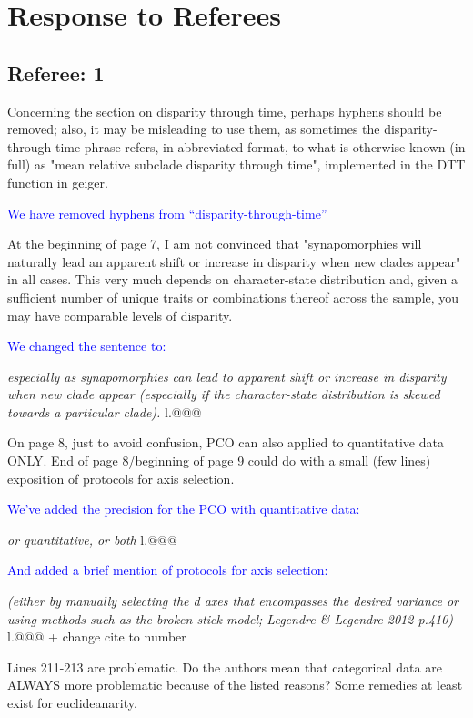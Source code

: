 \documentclass[12pt,letterpaper]{article}
\begin{document}
\section{Response to Referees}

\subsection{Referee: 1}
\noindent Concerning the section on disparity through time, perhaps hyphens should be removed; also, it may be misleading to use them, as sometimes the disparity-through-time phrase refers, in abbreviated format, to what is otherwise known (in full) as "mean relative subclade disparity through time", implemented in the DTT function in geiger.

\textcolor{blue}{We have removed hyphens from ``disparity-through-time''}

\noindent At the beginning of page 7, I am not convinced that "synapomorphies will naturally lead an apparent shift or increase in disparity when new clades appear" in all cases. This very much depends on character-state distribution and, given a sufficient number of unique traits or combinations thereof across the sample, you may have comparable levels of disparity.

\textcolor{blue}{We changed the sentence to:}

\textit{especially as synapomorphies can lead to apparent shift or increase in disparity when new clade appear (especially if the character-state distribution is skewed towards a particular clade).} l.@@@

\noindent On page 8, just to avoid confusion, PCO can also applied to quantitative data ONLY. End of page 8/beginning of page 9 could do with a small (few lines) exposition of protocols for axis selection.

\textcolor{blue}{We've added the precision for the PCO with quantitative data:}

\textit{or quantitative, or both} l.@@@

\textcolor{blue}{And added a brief mention of protocols for axis selection:}

\textit{(either by manually selecting the d axes that encompasses the desired variance or using methods such as the broken stick model; Legendre \& Legendre 2012 p.410)} l.@@@ + change cite to number

\noindent Lines 211-213 are problematic. Do the authors mean that categorical data are ALWAYS more problematic because of the listed reasons? Some remedies at least exist for euclideanarity.
\end{document}
